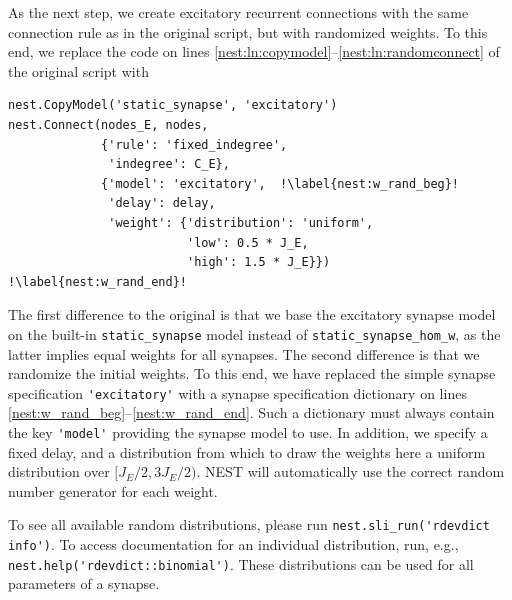 \documentclass{article}
\begin{document}
As the next step, we create excitatory recurrent connections with the
same connection rule as in the original script, but with randomized
weights. To this end, we replace the code on lines
\ref{nest:ln:copymodel}--\ref{nest:ln:randomconnect} of the original
script with
\begin{lstlisting}[name=brunel-rand]
nest.CopyModel('static_synapse', 'excitatory')
nest.Connect(nodes_E, nodes,
             {'rule': 'fixed_indegree', 
              'indegree': C_E},
             {'model': 'excitatory',  !\label{nest:w_rand_beg}!
              'delay': delay,
              'weight': {'distribution': 'uniform',
                         'low': 0.5 * J_E, 
                         'high': 1.5 * J_E}}) !\label{nest:w_rand_end}!
\end{lstlisting}
The first difference to the original is that we base the excitatory
synapse model on the built-in \lstinline!static_synapse! model instead
of \lstinline!static_synapse_hom_w!, as the latter implies equal
weights for all synapses. The second difference is that we randomize
the initial weights. To this end, we have replaced the simple synapse
specification \lstinline!'excitatory'! with a synapse specification
dictionary on lines \ref{nest:w_rand_beg}--\ref{nest:w_rand_end}. Such
a dictionary must always contain the key \lstinline!'model'! providing
the synapse model to use. In addition, we specify a fixed delay, and a
distribution from which to draw the weights here a uniform
distribution over $[J_E/2, 3J_E/2)$. NEST will automatically use the
correct random number generator for each weight. 

To see all available random distributions, please run
\lstinline!nest.sli_run('rdevdict info')!. To access documentation for
an individual distribution, run, e.g., \lstinline!nest.help('rdevdict::binomial')!.
These distributions can be
used for all parameters of a synapse.
\end{document}
